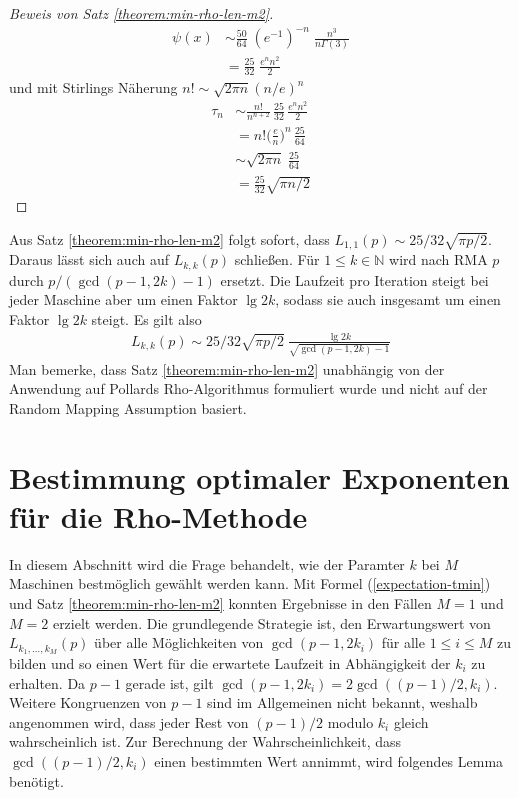 \documentclass[a4paper, 10pt, ngerman]{article}
\newcommand{\N}{\mathbb{N}}
\begin{document}
\begin{proof}[Beweis von Satz \ref{theorem:min-rho-len-m2}]
\begin{align*}
        [x^n] \psi(x)
         & \sim \frac {50} {64} \; (e^{-1})^{-n} \;
        \frac {n^3} {n \Gamma(3)}                   \\
         & = \frac {25} {32} \; \frac {e^n n^2} {2}
    \end{align*}
    und mit Stirlings Näherung $n! \sim \sqrt{2\pi n} (n/e)^n$
    \begin{align*}
        \tau_n
         & \sim \frac {n!}{n^{n + 2}} \, \frac {25} {32} \,\frac {e^n n^2} 2 \\
         & = n! \bigg (\frac {e} {n} \bigg )^n \, \frac {25} {64}            \\
         & \sim \sqrt {2 \pi n} \; \frac {25}{64}                            \\
         & = \frac {25} {32} \sqrt{\pi n/2}
    \end{align*}
\end{proof}

\noindent Aus Satz \ref{theorem:min-rho-len-m2} folgt sofort, dass $L_{1, 1}(p) \sim 25/32 \sqrt{\pi p / 2}$. Daraus lässt sich auch auf $L_{k, k}(p)$ schließen. Für $1 \le k \in \N$ wird nach RMA $p$ durch $p/(\gcd(p - 1, 2k) - 1)$ ersetzt. Die Laufzeit pro Iteration steigt bei jeder Maschine aber um einen Faktor $\lg 2k$, sodass sie auch insgesamt um einen Faktor $\lg 2k$ steigt. Es gilt also
\begin{align}
    L_{k, k}(p) \sim 25 / 32 \sqrt{\pi p /2} \
    \frac {\lg 2k} {\sqrt{\gcd(p - 1, 2k) - 1}}
    \label{lkkp}
\end{align}
Man bemerke, dass Satz \ref{theorem:min-rho-len-m2} unabhängig von der Anwendung auf Pollards Rho-Algorithmus formuliert wurde und nicht auf der Random Mapping Assumption basiert.

\section{Bestimmung optimaler Exponenten für die Rho-Methode}
\label{sec:optimal-k}

In diesem Abschnitt wird die Frage behandelt, wie der Paramter $k$ bei $M$ Maschinen bestmöglich gewählt werden kann. Mit Formel (\ref{expectation-tmin}) und Satz \ref{theorem:min-rho-len-m2} konnten Ergebnisse in den Fällen $M = 1$ und $M = 2$ erzielt werden. Die grundlegende Strategie ist, den Erwartungswert von $L_{k_1, \dots, k_M}(p)$ über alle Möglichkeiten von $\gcd(p - 1, 2k_i)$ für alle $1 \le i \le M$ zu bilden und so einen Wert für die erwartete Laufzeit in Abhängigkeit der $k_i$ zu erhalten. Da $p - 1$ gerade ist, gilt $\gcd(p-1, 2k_i) = 2\gcd((p - 1)/2, k_i)$. Weitere Kongruenzen von $p - 1$ sind im Allgemeinen nicht bekannt, weshalb angenommen wird, dass jeder Rest von $(p- 1)/2$ modulo $k_i$ gleich wahrscheinlich ist. Zur Berechnung der Wahrscheinlichkeit, dass $\gcd((p - 1)/2, k_i)$ einen bestimmten Wert annimmt, wird folgendes Lemma benötigt.
\end{document}
